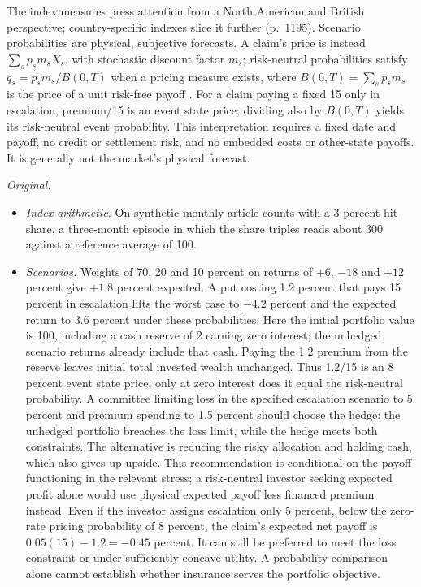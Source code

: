 \begin{qfmethod}
 The index measures press attention from a North American and British perspective; country-specific indexes slice it further (p.~1195). Scenario probabilities are physical, subjective forecasts. A claim's price is instead $\sum_s p_s m_s X_s$, with stochastic discount factor $m_s$; risk-neutral probabilities satisfy $q_s=p_sm_s/B(0,T)$ when a pricing measure exists, where $B(0,T)=\sum_s p_sm_s$ is the price of a unit risk-free payoff \citep[secs.~1.2 and~3.1--3.2, pp.~16--17 and~54--56]{asset-pricing-manuscript-2000}. For a claim paying a fixed 15 only in escalation, premium/15 is an event state price; dividing also by $B(0,T)$ yields its risk-neutral event probability. This interpretation requires a fixed date and payoff, no credit or settlement risk, and no embedded costs or other-state payoffs. It is generally not the market's physical forecast.

 \emph{Original.}
\begin{itemize}
\item \emph{Index arithmetic.} On synthetic monthly article counts with a 3 percent hit share, a three-month episode in which the share triples reads about 300 against a reference average of 100.
\item \emph{Scenarios.} Weights of 70, 20 and 10 percent on returns of $+6$, $-18$ and $+12$ percent give $+1.8$ percent expected. A put costing 1.2 percent that pays 15 percent in escalation lifts the worst case to $-4.2$ percent and the expected return to 3.6 percent under these probabilities. Here the initial portfolio value is 100, including a cash reserve of 2 earning zero interest; the unhedged scenario returns already include that cash. Paying the 1.2 premium from the reserve leaves initial total invested wealth unchanged. Thus 1.2/15 is an 8 percent event state price; only at zero interest does it equal the risk-neutral probability. A committee limiting loss in the specified escalation scenario to 5 percent and premium spending to 1.5 percent should choose the hedge: the unhedged portfolio breaches the loss limit, while the hedge meets both constraints. The alternative is reducing the risky allocation and holding cash, which also gives up upside. This recommendation is conditional on the payoff functioning in the relevant stress; a risk-neutral investor seeking expected profit alone would use physical expected payoff less financed premium instead. Even if the investor assigns escalation only 5 percent, below the zero-rate pricing probability of 8 percent, the claim's expected net payoff is $0.05(15)-1.2=-0.45$ percent. It can still be preferred to meet the loss constraint or under sufficiently concave utility. A probability comparison alone cannot establish whether insurance serves the portfolio objective.
\end{itemize}


\end{qfmethod}
